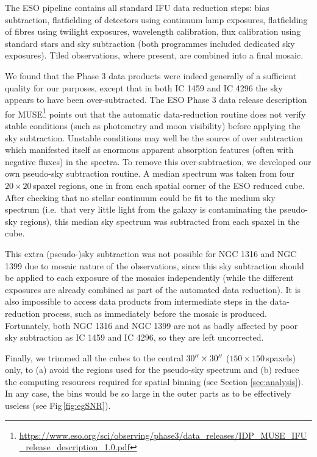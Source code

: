 		The ESO pipeline contains all standard IFU data reduction steps: bias subtraction, flatfielding of detectors using continuum lamp exposures, flatfielding of fibres using twilight exposures, wavelength calibration, flux calibration using standard stars and sky subtraction (both programmes included dedicated sky exposures). Tiled observations, where present, are combined into a final mosaic.

		We found that the Phase 3 data products were indeed generally of a sufficient quality for our purposes, except that in both IC 1459 and IC 4296 the sky appears to have been over-subtracted. The ESO Phase 3 data release description for MUSE\footnote{\url{https://www.eso.org/sci/observing/phase3/data\_releases/IDP\_MUSE\_IFU\_release\_description\_1.0.pdf}} points out that the automatic data-reduction routine does not verify stable conditions (such as photometry and moon visibility) before applying the sky subtraction. Unstable conditions may well be the source of over subtraction which manifested itself as enormous apparent absorption features (often with negative fluxes) in the spectra. To remove this over-subtraction, we developed our own pseudo-sky subtraction routine. A median spectrum was taken from four $20 \times 20$\,spaxel regions, one in from each spatial corner of the ESO reduced cube. After checking that no stellar continuum could be fit to the medium sky spectrum (i.e.\ that very little light from the galaxy is contaminating the pseudo-sky regions), this median sky spectrum was subtracted from each spaxel in the cube. 

		This extra (pseudo-)sky subtraction was not possible for NGC 1316 and NGC 1399 due to mosaic nature of the observations, since this sky subtraction should be applied to each exposure of the mosaics independently (while the different exposures are already combined as part of the automated data reduction). It is also impossible to access data products from intermediate steps in the data-reduction process, such as immediately before the mosaic is produced. Fortunately, both NGC 1316 and NGC 1399 are not as badly affected by poor sky subtraction as IC 1459 and IC 4296, so they are left uncorrected. 

		Finally, we trimmed all the cubes to the central $30\hbox{$^{\prime\prime}$} \times 30\hbox{$^{\prime\prime}$}$ ($150 \times 150$\,spaxels) only, to (a) avoid the regions used for the pseudo-sky spectrum and (b) reduce the computing resources required for spatial binning (see Section \ref{sec:analysis}). In any case, the bins would be so large in the outer parts as to be effectively useless (see Fig\,\ref{fig:egSNR}).

